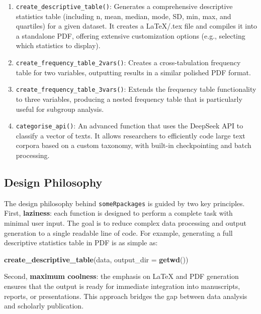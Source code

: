 \documentclass[
]{article}
\newenvironment{Shaded}{\begin{snugshade}}{\end{snugshade}}
\newcommand{\AttributeTok}[1]{\textcolor[rgb]{0.13,0.29,0.53}{#1}}
\newcommand{\FunctionTok}[1]{\textcolor[rgb]{0.13,0.29,0.53}{\textbf{#1}}}
\newcommand{\NormalTok}[1]{#1}
\begin{document}
\begin{enumerate}
\def\labelenumi{\arabic{enumi}.}
\item
  \texttt{create\_descriptive\_table()}: Generates a comprehensive
  descriptive statistics table (including n, mean, median, mode, SD,
  min, max, and quartiles) for a given dataset. It creates a LaTeX/.tex
  file and compiles it into a standalone PDF, offering extensive
  customization options (e.g., selecting which statistics to display).
\item
  \texttt{create\_frequency\_table\_2vars()}: Creates a cross-tabulation
  frequency table for two variables, outputting results in a similar
  polished PDF format.
\item
  \texttt{create\_frequency\_table\_3vars()}: Extends the frequency
  table functionality to three variables, producing a nested frequency
  table that is particularly useful for subgroup analysis.
\item
  \texttt{categorise\_api()}: An advanced function that uses the
  DeepSeek API to classify a vector of texts. It allows researchers to
  efficiently code large text corpora based on a custom taxonomy, with
  built-in checkpointing and batch processing.
\end{enumerate}

\subsection{Design Philosophy}\label{design-philosophy}

The design philosophy behind \texttt{someRpackages} is guided by two key
principles. First, \textbf{laziness}: each function is designed to
perform a complete task with minimal user input. The goal is to reduce
complex data processing and output generation to a single readable line
of code. For example, generating a full descriptive statistics table in
PDF is as simple as:

\begin{Shaded}
\begin{Highlighting}[]
\FunctionTok{create\_descriptive\_table}\NormalTok{(data, }\AttributeTok{output\_dir =} \FunctionTok{getwd}\NormalTok{())}
\end{Highlighting}
\end{Shaded}

Second, \textbf{maximum coolness}: the emphasis on LaTeX and PDF
generation ensures that the output is ready for immediate integration
into manuscripts, reports, or presentations. This approach bridges the
gap between data analysis and scholarly publication.
\end{document}
